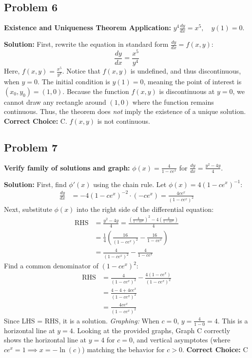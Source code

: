 \documentclass[12pt]{article}
\begin{document}
\subsection*{Problem 6}
\textbf{Existence and Uniqueness Theorem Application:} $y^4 \frac{dy}{dx} = x^5, \quad y(1)=0$.

\textbf{Solution:}
First, rewrite the equation in standard form $\frac{dy}{dx} = f(x,y)$:
\[ \frac{dy}{dx} = \frac{x^5}{y^4} \]
Here, $f(x,y) = \frac{x^5}{y^4}$. Notice that $f(x,y)$ is undefined, and thus discontinuous, when $y = 0$. 
The initial condition is $y(1) = 0$, meaning the point of interest is $(x_0, y_0) = (1, 0)$. Because the function $f(x,y)$ is discontinuous at $y=0$, we cannot draw any rectangle around $(1,0)$ where the function remains continuous. Thus, the theorem does \textit{not} imply the existence of a unique solution.
\textbf{Correct Choice:} C. $f(x,y)$ is not continuous.

\subsection*{Problem 7}
\textbf{Verify family of solutions and graph:} $\phi(x) = \frac{4}{1-ce^x}$ for $\frac{dy}{dx} = \frac{y^2 - 4y}{4}$.

\textbf{Solution:}
First, find $\phi'(x)$ using the chain rule. Let $\phi(x) = 4(1-ce^x)^{-1}$:
\begin{align*}
    \frac{dy}{dx} &= -4(1-ce^x)^{-2} \cdot (-ce^x) = \frac{4ce^x}{(1-ce^x)^2}
\end{align*}
Next, substitute $\phi(x)$ into the right side of the differential equation:
\begin{align*}
    \text{RHS} &= \frac{y^2 - 4y}{4} = \frac{\left( \frac{4}{1-ce^x} \right)^2 - 4\left( \frac{4}{1-ce^x} \right)}{4} \\
    &= \frac{1}{4} \left( \frac{16}{(1-ce^x)^2} - \frac{16}{1-ce^x} \right) \\
    &= \frac{4}{(1-ce^x)^2} - \frac{4}{1-ce^x}
\end{align*}
Find a common denominator of $(1-ce^x)^2$:
\begin{align*}
    \text{RHS} &= \frac{4}{(1-ce^x)^2} - \frac{4(1-ce^x)}{(1-ce^x)^2} \\
    &= \frac{4 - 4 + 4ce^x}{(1-ce^x)^2} \\
    &= \frac{4ce^x}{(1-ce^x)^2}
\end{align*}
Since LHS = RHS, it is a solution.
\textit{Graphing:} When $c = 0$, $y = \frac{4}{1-0} = 4$. This is a horizontal line at $y=4$. Looking at the provided graphs, Graph C correctly shows the horizontal line at $y=4$ for $c=0$, and vertical asymptotes (where $ce^x = 1 \implies x = -\ln(c)$) matching the behavior for $c > 0$.
\textbf{Correct Choice:} C
\end{document}
